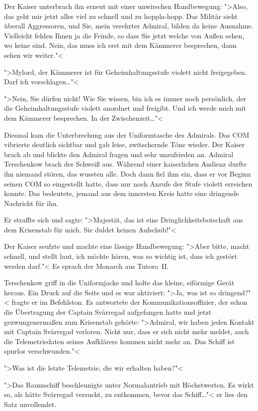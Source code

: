 Der Kaiser unterbrach ihn erneut mit einer unwirschen Handbewegung: ">Also, das geht mir jetzt alles viel zu schnell und zu hoppla-hopp. Das Militär sieht überall Aggressoren, und Sie, mein verehrter Admiral, bilden da keine Ausnahme. Vielleicht fehlen Ihnen ja die Feinde, so dass Sie jetzt welche von Außen sehen, wo keine sind. Nein, das muss ich erst mit dem Kämmerer besprechen, dann sehen wir weiter."<

">Mylord, der Kämmerer ist für Geheimhaltungsstufe violett nicht freigegeben. Darf ich vorschlagen\dots"<

">Nein, Sie dürfen nicht! Wie Sie wissen, bin ich es immer noch persönlich, der die Geheimhaltungsstufe violett anordnet und freigibt. Und ich werde mich mit dem Kämmerer besprechen. In der Zwischenzeit\dots"<

Diesmal kam die Unterbrechung aus der Uniformtasche des Admirals. Das COM vibrierte deutlich sichtbar und gab leise, zwitschernde Töne wieder. Der Kaiser brach ab und blickte den Admiral fragen und sehr unzufrieden an. Admiral Terschenkow brach der Schweiß aus. Während einer kaiserlichen Audienz durfte ihn niemand stören, das wussten alle. Doch dann fiel ihm ein, dass er vor Beginn seinen COM so eingestellt hatte, dass nur noch Anrufe der Stufe violett erreichen konnte. Das bedeutete, jemand aus dem innersten Kreis hatte eine dringende Nachricht für ihn.

Er straffte sich und sagte: ">Majestät, das ist eine Dringlichkeitsbotschaft aus dem Krisenstab für mich. Sie duldet keinen Aufschub!"<

Der Kaiser seufzte und machte eine lässige Handbewegung: ">Aber bitte, macht schnell, und stellt laut, ich möchte hören, was so wichtig ist, dass ich gestört werden darf."< Es sprach der Monarch aus Tutoro~II.

Terschenkow griff in die Uniformjacke und holte das kleine, eiförmige Gerät heraus. Ein Druck auf die Seite und es war aktiviert: ">Ja, was ist so dringend?"< fragte er im Befehlston. Es antwortete der Kommunikationsoffizier, der schon die Übertragung der Captain Svårregad aufgefangen hatte und jetzt gezwungenermaßen zum Krisenstab gehörte: ">Admiral, wir haben jeden Kontakt mit Captain Svårregad verloren. Nicht nur, dass er sich nicht mehr meldet, auch die Telemetriedaten seines Aufklärers kommen nicht mehr an. Das Schiff ist spurlos verschwunden."<

">Was ist die letzte Telemetrie, die wir erhalten haben?"<

">Das Raumschiff beschleunigte unter Normalantrieb mit Höchstwerten. Es wirkt so, als hätte Svårregad versucht, zu entkommen, bevor das Schiff\dots"< er lies den Satz unvollendet.

